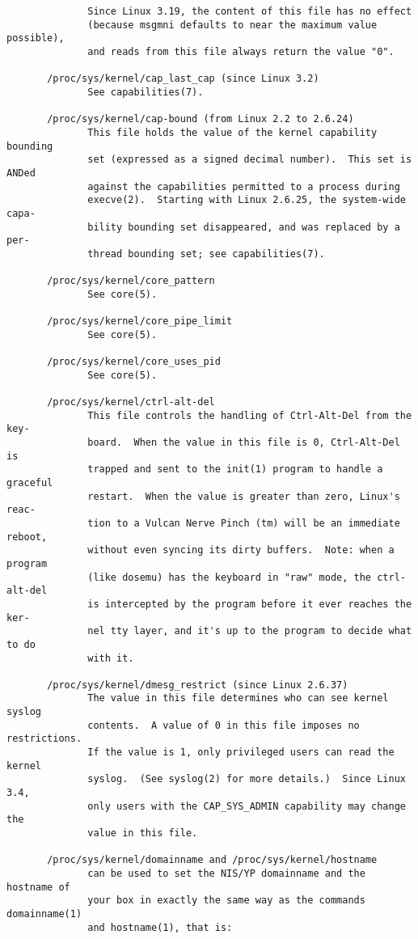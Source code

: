 \documentclass[]{article}
\begin{document}
\begin{verbatim}
              Since Linux 3.19, the content of this file has no effect
              (because msgmni defaults to near the maximum value possible),
              and reads from this file always return the value "0".

       /proc/sys/kernel/cap_last_cap (since Linux 3.2)
              See capabilities(7).

       /proc/sys/kernel/cap-bound (from Linux 2.2 to 2.6.24)
              This file holds the value of the kernel capability bounding
              set (expressed as a signed decimal number).  This set is ANDed
              against the capabilities permitted to a process during
              execve(2).  Starting with Linux 2.6.25, the system-wide capa‐
              bility bounding set disappeared, and was replaced by a per-
              thread bounding set; see capabilities(7).

       /proc/sys/kernel/core_pattern
              See core(5).

       /proc/sys/kernel/core_pipe_limit
              See core(5).

       /proc/sys/kernel/core_uses_pid
              See core(5).

       /proc/sys/kernel/ctrl-alt-del
              This file controls the handling of Ctrl-Alt-Del from the key‐
              board.  When the value in this file is 0, Ctrl-Alt-Del is
              trapped and sent to the init(1) program to handle a graceful
              restart.  When the value is greater than zero, Linux's reac‐
              tion to a Vulcan Nerve Pinch (tm) will be an immediate reboot,
              without even syncing its dirty buffers.  Note: when a program
              (like dosemu) has the keyboard in "raw" mode, the ctrl-alt-del
              is intercepted by the program before it ever reaches the ker‐
              nel tty layer, and it's up to the program to decide what to do
              with it.

       /proc/sys/kernel/dmesg_restrict (since Linux 2.6.37)
              The value in this file determines who can see kernel syslog
              contents.  A value of 0 in this file imposes no restrictions.
              If the value is 1, only privileged users can read the kernel
              syslog.  (See syslog(2) for more details.)  Since Linux 3.4,
              only users with the CAP_SYS_ADMIN capability may change the
              value in this file.

       /proc/sys/kernel/domainname and /proc/sys/kernel/hostname
              can be used to set the NIS/YP domainname and the hostname of
              your box in exactly the same way as the commands domainname(1)
              and hostname(1), that is:


\end{verbatim}
\end{document}

